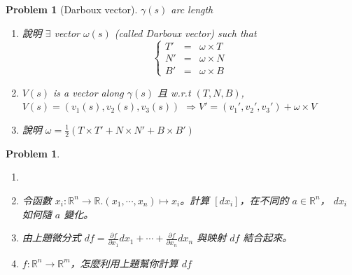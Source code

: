 \documentclass[10pt,a4paper]{article}
\newcounter{theProblemCounter}
\newtheorem{problem}[theProblemCounter]{Problem}
\begin{document}
\setcounter{theProblemCounter}{4}
\begin{problem}[Darboux vector]
$\gamma(s)$ arc length
\begin{enumerate}
\item[(a)] 說明 $\exists$ vector $\omega(s)$ (called \emph{Darboux vector}) such that 
\[
\left\{
\begin{array}{ccc}
T' &=& \omega\times T\\
N' &=& \omega\times N\\
B' &=& \omega\times B\end{array}
\right.
\]
\item[(b)] $V(s)$ is a vector along $\gamma(s)$ 且 w.r.t $(T, N,B)$, $V(s)=(v_1(s), v_2(s), v_3(s))$ $\Rightarrow V' = (v_1', v_2', v_3') + \omega \times V$
\item[(c)] 說明 $\omega=\frac12 (T\times T' + N\times N' + B\times B')$
\end{enumerate}
\end{problem}

\setcounter{theProblemCounter}{7}
\begin{problem}
\begin{enumerate}
\item[]
\item[(a)] 令函數 $x_i:\mathbb{R}^n\to \mathbb{R}. (x_1,\cdots, x_n)\mapsto x_i$。計算 $[dx_i]$，在不同的 $a\in \mathbb{R}^n$， $dx_i$ 如何隨 $a$ 變化。
\item[(b)] 由上題微分式 $df=\frac{\partial f}{\partial x_1} dx_1 + \cdots + \frac{\partial f}{\partial x_n} dx_n$ 與映射 $df$ 結合起來。
\item[(c)] $f:\mathbb{R}^n\to \mathbb{R}^m$，怎麼利用上題幫你計算 $df$
\end{enumerate}
\end{problem}
\end{document}
